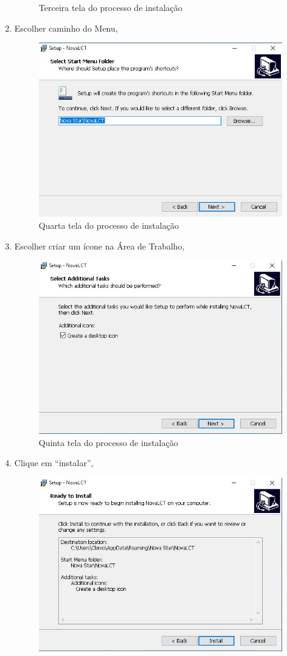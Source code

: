 \documentclass[12pt, a4paper]{article}
\begin{document}
\begin{enumerate}
\begin{figure}[!htb]
			\caption{Terceira tela do processo de instalação}
		\end{figure}
		\newpage
		\item Escolher caminho do Menu,
		\begin{figure}[!htb]
			\centering
			\includegraphics[width=.8\textwidth]{D4.jpeg}
			\caption{Quarta tela do processo de instalação}
		\end{figure}
		\item Escolher criar um ícone na Área de Trabalho,
		\begin{figure}[!htb]
			\centering
			\includegraphics[width=.8\textwidth]{D5.jpeg}
			\caption{Quinta tela do processo de instalação}
		\end{figure}
		\newpage
		\item Clique em ``instalar'',
		\begin{figure}[!htb]
			\centering
			\includegraphics[width=.8\textwidth]{D6.jpeg}

\end{figure}
\end{enumerate}
\end{document}
